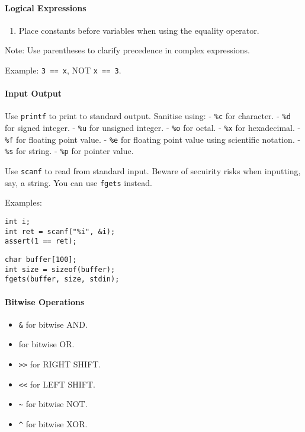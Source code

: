 \documentclass[twocolumn,english]{article}
\begin{document}
\paragraph{Logical Expressions}\label{logical-expressions}

\begin{enumerate}
\def\labelenumi{\arabic{enumi}.}

\item
  Place constants before variables when using the equality operator.
\end{enumerate}

Note: Use parentheses to clarify precedence in complex expressions.

Example: \texttt{3\ ==\ x}, NOT \texttt{x\ ==\ 3}.

\paragraph{Input Output}\label{input-output}

Use \texttt{printf} to print to standard output. Sanitise using: -
\texttt{\%c} for character. - \texttt{\%d} for signed integer. -
\texttt{\%u} for unsigned integer. - \texttt{\%o} for octal. -
\texttt{\%x} for hexadecimal. - \texttt{\%f} for floating point value. -
\texttt{\%e} for floating point value using scientific notation. -
\texttt{\%s} for string. - \texttt{\%p} for pointer value.

Use \texttt{scanf} to read from standard input. Beware of secuirity
risks when inputting, say, a string. You can use \texttt{fgets} instead.

Examples:

\begin{verbatim}
int i;
int ret = scanf("%i", &i);
assert(1 == ret);
\end{verbatim}

\begin{verbatim}
char buffer[100];
int size = sizeof(buffer);
fgets(buffer, size, stdin);
\end{verbatim}

\paragraph{Bitwise Operations}\label{bitwise-operations}

\begin{itemize}

\item
  \texttt{\&} for bitwise AND.
\item
  \texttt{\textbar{}} for bitwise OR.
\item
  \texttt{\textgreater{}\textgreater{}} for RIGHT SHIFT.
\item
  \texttt{\textless{}\textless{}} for LEFT SHIFT.
\item
  \texttt{\textasciitilde{}} for bitwise NOT.
\item
  \texttt{\^{}} for bitwise XOR.
\end{itemize}
\end{document}
